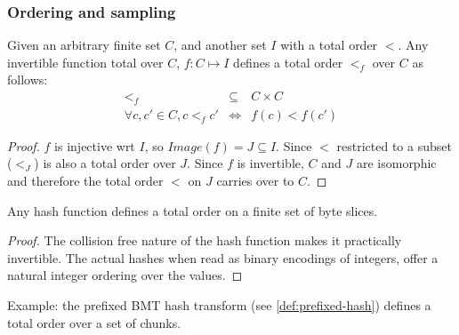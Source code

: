 \subsubsection{Ordering and sampling}


\begin{lemma}
\label{lem:ordering}
Given an arbitrary finite set $C$, and another set $I$ with a total order $<$.
Any invertible function total over $C$, $f: C\mapsto I$ defines a total order $<_f$ over $C$ as follows:
%
\begin{eqnarray}
<_f&\subseteq&C\times C\\
\forall c,c'\in C, c<_f c'&\Leftrightarrow& f(c)<f(c')
\end{eqnarray}

\begin{proof}
$f$ is injective wrt $I$, so $\mathit{Image}(f)=J\subseteq I$. Since $<$ restricted to a subset ($<_J$) is also a total order over $J$.
Since $f$ is invertible, $C$ and $J$ are isomorphic and therefore the total order $<$ on $J$ carries over to $C$. \qedsymbol
\end{proof}
\end{lemma}

\begin{corollary}
Any hash function defines a total order on a finite set of byte slices.
%
\begin{proof}
The collision free nature of the hash function makes it practically invertible. The actual hashes when read as binary encodings of integers, offer a natural integer ordering over the values. 
\end{proof}

Example: the prefixed BMT hash transform (see \ref{def:prefixed-hash}) defines a total order over a set of chunks.
\end{corollary}

